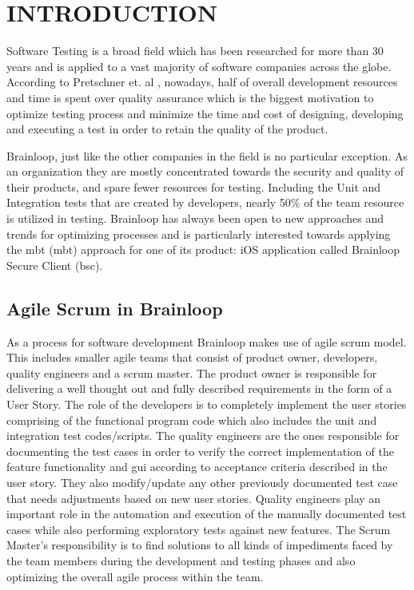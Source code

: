 \chapter{INTRODUCTION}
\label{chapter:introduction}

\par
Software Testing is a broad field which has been researched for more than 30 years and is applied to a vast majority of software companies across the globe. According to Pretschner et. al \cite{Pretschner_MBTInPractice}, nowadays, half of overall development resources and time is spent over quality assurance which is the biggest motivation to optimize testing process and minimize the time and cost of designing, developing and executing a test in order to retain the quality of the product.


\par
Brainloop, just like the other companies in the field is no particular exception. As an organization they are mostly concentrated towards the security and quality of their products, and spare fewer resources for testing. Including the Unit and Integration tests that are created by developers, nearly 50\% of the team resource is utilized in testing. Brainloop has always been open to new approaches and trends for optimizing processes and is particularly interested towards applying the \acrlong{mbt} (\acrshort{mbt}) approach for one of its product: iOS application called Brainloop Secure Client (\acrshort{bsc}).

\section{Agile Scrum in Brainloop}

\par
As a process for software development Brainloop makes use of agile scrum \cite{Agile_Scrum} model. This includes smaller agile teams that consist of product owner, developers, quality engineers and a scrum master. The product owner is responsible for delivering a well thought out and fully described requirements in the form of a User Story. The role of the developers is to completely implement the user stories comprising of the functional program code which also includes the unit and integration test codes/scripts. The quality engineers are the ones responsible for documenting the test cases in order to verify the correct implementation of the feature functionality and \acrlong{gui} according to acceptance criteria described in the user story. They also modify/update any other previously documented test case that needs adjustments based on new user stories. Quality engineers play an important role in the automation and execution of the manually documented test cases while also performing exploratory tests against new features. The Scrum Master's responsibility is to find solutions to all kinds of impediments faced by the team members during the development and testing phases and also optimizing the overall agile process within the team.

